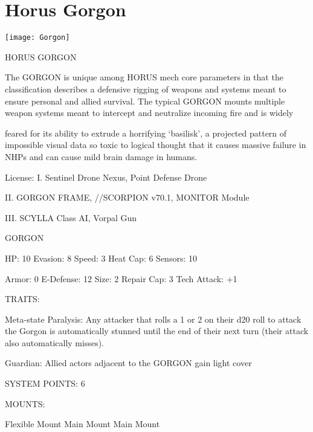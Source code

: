 \section{Horus Gorgon}

\centering\texttt{[image: Gorgon]}

                                              HORUS GORGON

The GORGON is unique among HORUS mech core parameters in that the classification describes a
defensive rigging of weapons and systems meant to ensure personal and allied survival. The typical
GORGON mounts multiple weapon systems meant to intercept and neutralize incoming fire and is widely

feared for its ability to extrude a horrifying ‘basilisk’, a projected pattern of impossible visual data so toxic to
logical thought that it causes massive failure in NHPs and can cause mild brain damage in humans.




                                                   License:
I. Sentinel Drone Nexus, Point Defense Drone

II. GORGON FRAME,  //SCORPION v70.1, MONITOR Module

III. SCYLLA Class AI, Vorpal Gun


                                                 GORGON

 HP: 10         Evasion: 8                            Speed: 3            Heat Cap: 6        Sensors: 10

 Armor: 0       E-Defense: 12                         Size: 2             Repair Cap: 3      Tech Attack:
                                                                                             +1

                                                   TRAITS:

 Meta-state Paralysis: Any attacker that rolls a 1 or 2 on their d20 roll to attack the Gorgon is
 automatically stunned until the end of their next turn (their attack also automatically misses).

 Guardian: Allied actors adjacent to the GORGON gain light cover

                                             SYSTEM POINTS: 6

                                                  MOUNTS:

 Flexible Mount                    Main Mount                             Main Mount

